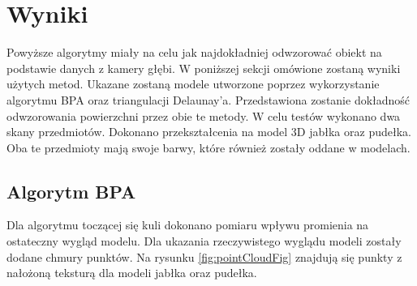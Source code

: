 \section{Wyniki}
Powyższe algorytmy miały na celu jak najdokładniej odwzorować obiekt na podstawie danych z kamery głębi. W poniższej sekcji omówione zostaną wyniki użytych metod. Ukazane zostaną modele utworzone poprzez wykorzystanie algorytmu BPA oraz triangulacji Delaunay'a. Przedstawiona zostanie dokładność odwzorowania powierzchni przez obie te metody. W celu testów wykonano dwa skany przedmiotów. Dokonano przekształcenia na model 3D jabłka oraz pudełka. Oba te przedmioty mają swoje barwy, które również zostały oddane w modelach.
\subsection{Algorytm BPA}
Dla algorytmu toczącej się kuli dokonano pomiaru wpływu promienia na ostateczny wygląd modelu. Dla ukazania rzeczywistego wyglądu modeli zostały dodane chmury punktów. Na rysunku \ref{fig:pointCloudFig} znajdują się punkty z nałożoną teksturą dla modeli jabłka oraz pudełka.
